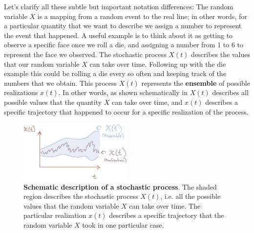 Let's clarify all these subtle but important notation differences: The random
variable $X$ is a mapping from a random event to the real line; in other words,
for a particular quantity that we want to describe we assign a number to
represent the event that happened. A useful example is to think about it as
getting to observe a specific face once we roll a die, and assigning a number
from 1 to 6 to represent the face we observed. The stochastic process $X(t)$
describes the values that our random variable $X$ can take over time. Following
up with the die example this could be rolling a die every so often and keeping
track of the numbers that we obtain. This process $X(t)$ represents the
\textbf{ensemble} of possible realizations $x(t)$. In other words, as shown
schematically in  $X(t)$ describes all possible values that
the quantity $X$ can take over time, and $x(t)$ describes a specific trajectory
that happened to occur for a specific realization of the process.

\begin{figure}[h!]
	\centering \includegraphics[width=0.5\textwidth]
  {./fig/chapter_prob/01_00001.jpeg}
	\caption{\textbf{Schematic description of a stochastic process}. The shaded
	region describes the stochastic process $X(t)$, i.e. all the possible values
	that the random variable $X$ can take over time. The particular realization
	$x(t)$ describes a specific trajectory that the random variable $X$ took in
	one particular case.}
  \label{fig01_00001}
\end{figure}

